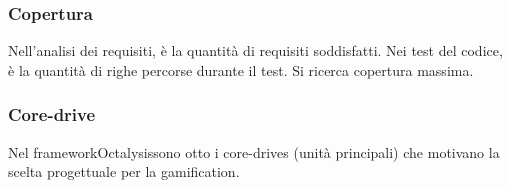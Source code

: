 \subsubsection*{Copertura}
Nell'analisi dei requisiti, è la quantità di requisiti soddisfatti. Nei test del codice, è la quantità di righe percorse durante il test. Si ricerca copertura massima.

\subsubsection*{Core-drive}
Nel framework\glosp Octalysis\glosp sono otto i core-drives (unità principali) che motivano la scelta progettuale per la gamification\glo.

